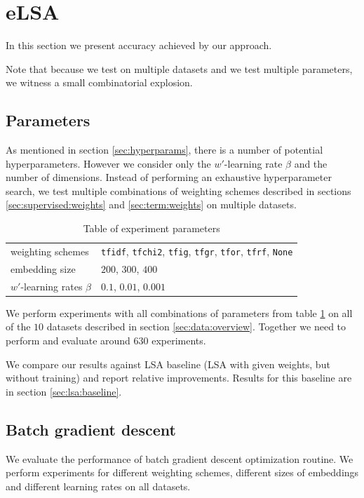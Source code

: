 \section{eLSA}
    
    In this section we present accuracy achieved by our approach.
    
    Note that because we test on multiple datasets and we test multiple parameters, we witness a small combinatorial explosion.

    \subsection{Parameters}
    
    As mentioned in section \ref{sec:hyperparams}, there is a number of potential hyperparameters. 
    However we consider only the $w'$-learning rate $\beta$ and the number of dimensions.
    Instead of performing an exhaustive hyperparameter search, we test multiple combinations of weighting schemes described in sections \ref{sec:supervised:weights} and \ref{sec:term:weights} on multiple datasets. 

    \begin{table}[H]
\begin{center}
\begin{tabular}{l|l}
\toprule
\midrule
weighting schemes & \texttt{tfidf}, \texttt{tfchi2}, \texttt{tfig}, \texttt{tfgr}, \texttt{tfor}, \texttt{tfrf}, \texttt{None} \\
embedding size & $200$, $300$, $400$ \\
$w'$-learning rates $\beta$ & $0.1$, $0.01$, $0.001$\\
\bottomrule
\end{tabular}
\caption[Table of experiment parameters]{Table of experiment parameters}
\label{tab:exp:params}
\end{center}
\end{table}
    
    We perform experiments with all combinations of parameters from table \ref{tab:exp:params} on all of the $10$ datasets described in section \ref{sec:data:overview}.
    Together we need to perform and evaluate around $630$ experiments.
    
    We compare our results against LSA baseline (LSA with given weights, but without training) and report relative improvements.
    Results for this baseline are in section \ref{sec:lsa:baseline}.
    
    \subsection{Batch gradient descent}
    We evaluate the performance of batch gradient descent optimization routine.
    We perform experiments for different weighting schemes, different sizes of embeddings and different learning rates on all datasets.

